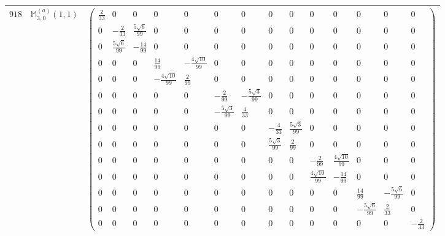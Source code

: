 \documentclass[fleqn,8pt,landscape]{jsarticle}
\begin{document}
\begin{center}
\begin{longtable}{ccc}
$ 918 $ & $ \mathbb{M}_{3,0}^{(a)}(1,1) $ & $ \begin{pmatrix} \frac{2}{33} & 0 & 0 & 0 & 0 & 0 & 0 & 0 & 0 & 0 & 0 & 0 & 0 & 0 \\ 0 & - \frac{2}{33} & \frac{5 \sqrt{6}}{99} & 0 & 0 & 0 & 0 & 0 & 0 & 0 & 0 & 0 & 0 & 0 \\ 0 & \frac{5 \sqrt{6}}{99} & - \frac{14}{99} & 0 & 0 & 0 & 0 & 0 & 0 & 0 & 0 & 0 & 0 & 0 \\ 0 & 0 & 0 & \frac{14}{99} & - \frac{4 \sqrt{10}}{99} & 0 & 0 & 0 & 0 & 0 & 0 & 0 & 0 & 0 \\ 0 & 0 & 0 & - \frac{4 \sqrt{10}}{99} & \frac{2}{99} & 0 & 0 & 0 & 0 & 0 & 0 & 0 & 0 & 0 \\ 0 & 0 & 0 & 0 & 0 & - \frac{2}{99} & - \frac{5 \sqrt{3}}{99} & 0 & 0 & 0 & 0 & 0 & 0 & 0 \\ 0 & 0 & 0 & 0 & 0 & - \frac{5 \sqrt{3}}{99} & \frac{4}{33} & 0 & 0 & 0 & 0 & 0 & 0 & 0 \\ 0 & 0 & 0 & 0 & 0 & 0 & 0 & - \frac{4}{33} & \frac{5 \sqrt{3}}{99} & 0 & 0 & 0 & 0 & 0 \\ 0 & 0 & 0 & 0 & 0 & 0 & 0 & \frac{5 \sqrt{3}}{99} & \frac{2}{99} & 0 & 0 & 0 & 0 & 0 \\ 0 & 0 & 0 & 0 & 0 & 0 & 0 & 0 & 0 & - \frac{2}{99} & \frac{4 \sqrt{10}}{99} & 0 & 0 & 0 \\ 0 & 0 & 0 & 0 & 0 & 0 & 0 & 0 & 0 & \frac{4 \sqrt{10}}{99} & - \frac{14}{99} & 0 & 0 & 0 \\ 0 & 0 & 0 & 0 & 0 & 0 & 0 & 0 & 0 & 0 & 0 & \frac{14}{99} & - \frac{5 \sqrt{6}}{99} & 0 \\ 0 & 0 & 0 & 0 & 0 & 0 & 0 & 0 & 0 & 0 & 0 & - \frac{5 \sqrt{6}}{99} & \frac{2}{33} & 0 \\ 0 & 0 & 0 & 0 & 0 & 0 & 0 & 0 & 0 & 0 & 0 & 0 & 0 & - \frac{2}{33} \end{pmatrix} $ \\ \hline

\end{longtable}
\end{center}
\end{document}
